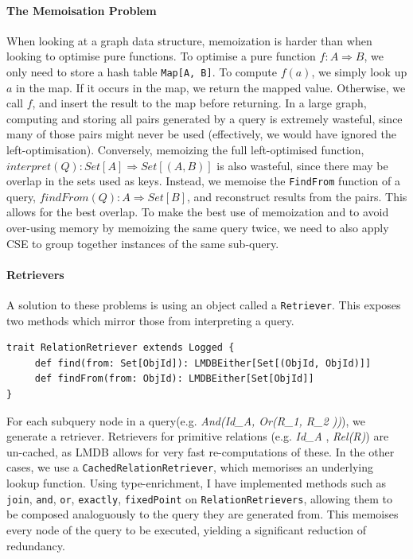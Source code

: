 \documentclass[12pt,a4paper,twoside,openright]{report}
\newcommand\codeName[1]{\texttt{#1}}
\newcommand\mathName[1]{\textit{#1}}
\renewcommand{\baselinestretch}{1.1}    %
\begin{document}
		\paragraph{The Memoisation Problem}
		When looking at a graph data structure, memoization is harder than when looking to optimise pure functions. To optimise a pure function $f\colon A \Rightarrow B$, we only need to store a hash table \codeName{Map[A, B]}. To compute $f(a)$, we simply look up $a$ in the map. If it occurs in the map, we return the mapped value. Otherwise, we call $f$, and insert the result to the map before returning. In a large graph, computing and storing all pairs generated by a query is extremely wasteful, since many of those pairs might never be used (effectively, we would have ignored the left-optimisation). Conversely, memoizing the full left-optimised function, $interpret(Q)\colon Set[A] \Rightarrow Set[(A, B)]$ is also wasteful, since there may be overlap in the sets used as keys. Instead, we memoise the \codeName{FindFrom} function of a query, $findFrom(Q)\colon A \Rightarrow Set[B]$, and reconstruct results from the pairs. This allows for the best overlap. To make the best use of memoization and to avoid over-using memory by memoizing the same query twice, we need to also apply CSE to group together instances of the same sub-query.

		\paragraph{Retrievers}
		A solution to these problems is using an object called a \codeName{Retriever}. This exposes two methods which mirror those from interpreting a query. 
		\renewcommand{\baselinestretch}{0.8}
		\begin{framed}
			\begin{verbatim}
trait RelationRetriever extends Logged {
     def find(from: Set[ObjId]): LMDBEither[Set[(ObjId, ObjId)]]
     def findFrom(from: ObjId): LMDBEither[Set[ObjId]]
}
			\end{verbatim}
		\end{framed}
		\renewcommand{\baselinestretch}{1.1}
		
		For each subquery node in a query(e.g. \mathName{And(Id_A, Or(R_1, R_2 ))}), we generate a retriever. Retrievers for primitive relations (e.g. \mathName{Id_A} , \mathName{Rel(R)}) are un-cached, as LMDB allows for very fast re-computations of these. In the other cases, we use a \codeName{CachedRelationRetriever}, which memorises an underlying lookup function. Using type-enrichment, I have implemented methods such as \codeName{join}, \codeName{and}, \codeName{or}, \codeName{exactly}, \codeName{fixedPoint} on \codeName{RelationRetrievers}, allowing them to be composed analoguously to the query they are generated from. This memoises every node of the query to be executed, yielding a significant reduction of redundancy.
	
\end{document}
